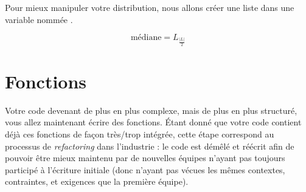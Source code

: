 \documentclass[11pt,a4paper]{article}
\begin{document}
\bigskip

Pour mieux manipuler votre distribution, nous allons créer une liste dans une variable nommée .

\bigskip



\bigskip


\begin{center} %
\begin{equation*}
\text{médiane} = L_{\frac{|L|}{2}}
\end{equation*}
\end{center}



\newpage %
\section{Fonctions}

\bigskip

Votre code devenant de plus en plus complexe, mais de plus en plus structuré, vous allez maintenant écrire des fonctions.
\'Etant donné que votre code contient déjà ces fonctions de façon très/trop intégrée, cette étape correspond au processus de \textit{refactoring} dans l'industrie : le code est démêlé et réécrit afin de pouvoir être mieux maintenu par de nouvelles équipes n'ayant pas toujours participé à l'écriture initiale (donc n'ayant pas vécues les mêmes contextes, contraintes, et exigences que la première équipe).
\end{document}
